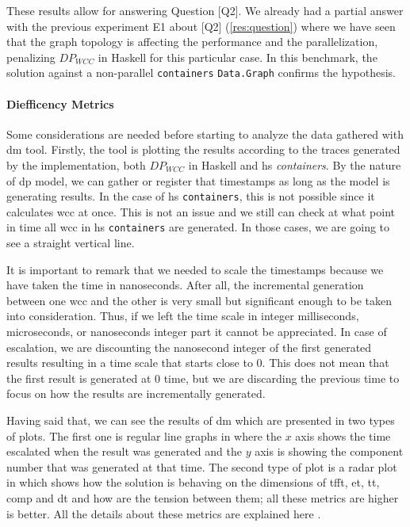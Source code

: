These results allow for answering Question [Q2].
We already had a partial answer with the previous experiment E1 about [Q2] (\autoref{res:question}) where we have seen that the graph topology is affecting the performance and the parallelization, penalizing $DP_{WCC}$ in Haskell for this particular case. In this benchmark, the solution against a non-parallel \texttt{containers} \texttt{Data.Graph} confirms the hypothesis. 

\paragraph{Diefficency Metrics}\label{sub:sub:sec:e2}
Some considerations are needed before starting to analyze the data gathered with \acrshort{dm} tool. Firstly, the tool is plotting the results according to the traces generated by the implementation, both $DP_{WCC}$ in Haskell  and \acrshort{hs} \emph{containers}. By the nature of \acrshort{dp} model, we can gather or register that timestamps as long as the model is generating results. In the case of \acrshort{hs} \texttt{containers}, this is not possible since it calculates \acrshort{wcc} at once. This is not an issue and we still can check at what point in time all \acrshort{wcc} in \acrshort{hs} \texttt{containers} are generated. In those cases, we are going to see a straight vertical line. 

It is important to remark that we needed to scale the timestamps because we have taken the time in nanoseconds. After all, the incremental generation between one \acrshort{wcc} and the other is very small but significant enough to be taken into consideration. Thus, if we left the time scale in integer milliseconds, microseconds, or nanoseconds integer part it cannot be appreciated. In case of escalation, we are discounting the nanosecond integer of the first generated results resulting in a time scale that starts close to $0$. This does not mean that the first result is generated at $0$ time, but we are discarding the previous time to focus on how the results are incrementally generated.

Having said that, we can see the results of \acrshort{dm} which are presented in two types of plots. The first one is regular line graphs in where the $x$ axis shows the time escalated when the result was generated and the $y$ axis is showing the component number that was generated at that time. The second type of plot is a radar plot in which shows how the solution is behaving on the dimensions of  \acrfull{tfft}, \acrfull{et}, \acrfull{tt}, \acrfull{comp} and \acrfull{dt} and how are the tension between them; all these metrics are higher is better. All the details about these metrics are explained here \cite{diefpaper}.

